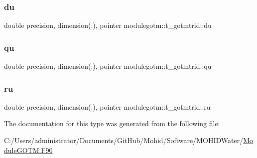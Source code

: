 \subsubsection{\texorpdfstring{du}{du}}
{\footnotesize\ttfamily double precision, dimension(\+:), pointer modulegotm\+::t\+\_\+gotmtrid\+::du\hspace{0.3cm}{\ttfamily [private]}}

\mbox{\label{structmodulegotm_1_1t__gotmtrid_a77dfb895a7480285da2867c50addfef0}} 
\subsubsection{\texorpdfstring{qu}{qu}}
{\footnotesize\ttfamily double precision, dimension(\+:), pointer modulegotm\+::t\+\_\+gotmtrid\+::qu\hspace{0.3cm}{\ttfamily [private]}}

\mbox{\label{structmodulegotm_1_1t__gotmtrid_ada03278c23e54a9d91684e4dd43a8077}} 
\subsubsection{\texorpdfstring{ru}{ru}}
{\footnotesize\ttfamily double precision, dimension(\+:), pointer modulegotm\+::t\+\_\+gotmtrid\+::ru\hspace{0.3cm}{\ttfamily [private]}}



The documentation for this type was generated from the following file\+:\begin{DoxyCompactItemize}
\item 
C\+:/\+Users/administrator/\+Documents/\+Git\+Hub/\+Mohid/\+Software/\+M\+O\+H\+I\+D\+Water/\mbox{\hyperlink{_module_g_o_t_m_8_f90}{Module\+G\+O\+T\+M.\+F90}}\end{DoxyCompactItemize}
